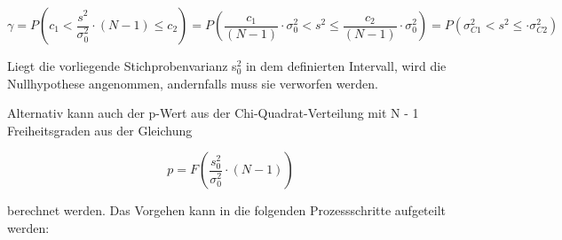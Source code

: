 \begin{equation}\label{eq:sixeightyfive}
\gamma =P\left(c_{1} <\dfrac{s^{2} }{\sigma _{0}^{2} } \cdot \left(N-1\right)\le c_{2} \right)=P\left(\dfrac{c_{1} }{\left(N-1\right)} \cdot \sigma _{0}^{2} <s^{2} \le \dfrac{c_{2} }{\left(N-1\right)} \cdot \sigma _{0}^{2} \right)=P\left(\sigma _{C1}^{2} <s^{2} \le \cdot \sigma _{C2}^{2} \right)
\end{equation}

\noindent Liegt die vorliegende Stichprobenvarianz s$_{0}^{2}$ in dem definierten Intervall, wird die Nullhypothese angenommen, andernfalls muss sie verworfen werden.\newline

\noindent Alternativ kann auch der p-Wert aus der Chi-Quadrat-Verteilung mit N - 1 Freiheitsgraden aus der Gleichung

\begin{equation}\label{eq:sixeightysix}
p=F\left(\dfrac{s_{0}^{2}}{\sigma _{0}^{2}} \cdot (N-1)\right)
\end{equation}

\noindent berechnet werden. Das Vorgehen kann in die folgenden Prozessschritte aufgeteilt werden:

\clearpage 

